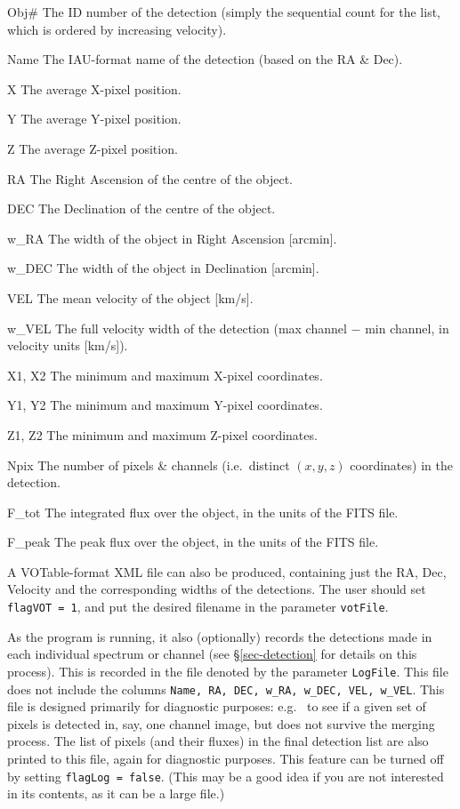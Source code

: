 \documentclass[12pt]{article}
\newcommand{\eg}{e.g.\ }
\newcommand{\ie}{i.e.\ }
\newcommand{\entrylabel}[1]{\mbox{\textsf{\bf{#1:}}}\hfil}
\newenvironment{entry}
        {\begin{list}{}%
                {\renewcommand{\makelabel}{\entrylabel}%
                        \setlength{\labelwidth}{30mm}%
                        \setlength{\labelsep}{5pt}%
                        \setlength{\itemsep}{2pt}%
                        \setlength{\parsep}{2pt}%
                        \setlength{\leftmargin}{35mm}%
                }%
        }%
{\end{list}}
\begin{document}
\begin{entry}
\item[Obj\#] The ID number of the detection (simply the sequential
  count for the list, which is ordered by increasing velocity).
\item[Name] The IAU-format name of the detection (based on the RA \&
Dec).
\item[X] The average X-pixel position.
\item[Y] The average Y-pixel position.
\item[Z] The average Z-pixel position.
\item[RA] The Right Ascension of the centre of the object.
\item[DEC] The Declination of the centre of the object.
\item[w\_RA] The width of the object in Right Ascension [arcmin].
\item[w\_DEC] The width of the object in Declination [arcmin].
\item[VEL] The mean velocity of the object [km/s].
\item[w\_VEL] The full velocity width of the detection (max channel
  $-$ min channel, in velocity units [km/s]).
\item[X1, X2] The minimum and maximum X-pixel coordinates.
\item[Y1, Y2] The minimum and maximum Y-pixel coordinates.
\item[Z1, Z2] The minimum and maximum Z-pixel coordinates.
\item[Npix] The number of pixels \& channels (\ie distinct $(x,y,z)$
  coordinates) in the detection.
\item[F\_tot] The integrated flux over the object, in the units of the
  FITS file. %
\item[F\_peak] The peak flux over the object, in the units of the FITS
  file.
\end{entry}

A VOTable-format XML file can also be produced, containing just the RA,
Dec, Velocity and the corresponding widths of the detections. The user
should set {\tt flagVOT = 1}, and put the desired filename in the
parameter {\tt votFile}.

As the program is running, it also (optionally) records the detections
made in each individual spectrum or channel (see
\S\ref{sec-detection} for details on this process). This is
recorded in the file denoted by the parameter {\tt LogFile}. This file
does not include the columns {\tt Name, RA, DEC, w\_RA, w\_DEC, VEL,
w\_VEL}. This file is designed primarily for diagnostic purposes: \eg
to see if a given set of pixels is detected in, say, one channel
image, but does not survive the merging process. The list of pixels
(and their fluxes) in the final detection list are also printed to
this file, again for diagnostic purposes. This feature can be turned
off by setting {\tt flagLog = false}. (This may be a good idea if you
are not interested in its contents, as it can be a large file.)
\end{document}
